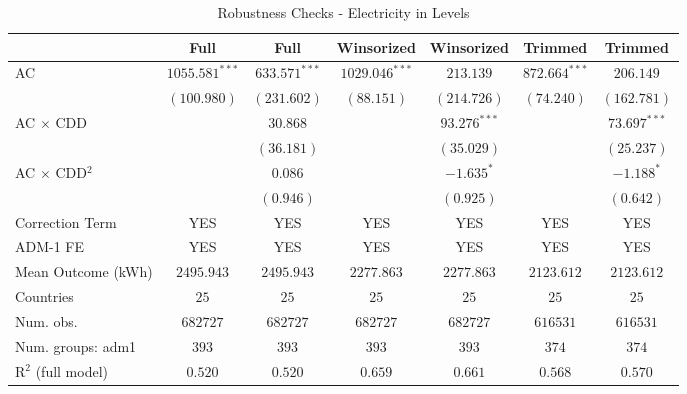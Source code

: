
\begin{table}[H]
\caption{Robustness Checks - Electricity in Levels}
\begin{center}
\begin{tabular}{l c c c c c c}
\hline
 & Full & Full & Winsorized & Winsorized & Trimmed & Trimmed \\
\hline
AC                      & $1055.581^{***}$ & $633.571^{***}$ & $1029.046^{***}$ & $213.139$      & $872.664^{***}$ & $206.149$      \\
                        & $(100.980)$      & $(231.602)$     & $(88.151)$       & $(214.726)$    & $(74.240)$      & $(162.781)$    \\
AC $\times$ CDD         &                  & $30.868$        &                  & $93.276^{***}$ &                 & $73.697^{***}$ \\
                        &                  & $(36.181)$      &                  & $(35.029)$     &                 & $(25.237)$     \\
AC $\times$ CDD$^2$     &                  & $0.086$         &                  & $-1.635^{*}$   &                 & $-1.188^{*}$   \\
                        &                  & $(0.946)$       &                  & $(0.925)$      &                 & $(0.642)$      \\
\hline
Correction Term         & YES              & YES             & YES              & YES            & YES             & YES            \\
ADM-1 FE                & YES              & YES             & YES              & YES            & YES             & YES            \\
Mean Outcome (kWh)      & $2495.943$       & $2495.943$      & $2277.863$       & $2277.863$     & $2123.612$      & $2123.612$     \\
Countries               & $25$             & $25$            & $25$             & $25$           & $25$            & $25$           \\
Num. obs.               & $682727$         & $682727$        & $682727$         & $682727$       & $616531$        & $616531$       \\
Num. groups: adm1       & $393$            & $393$           & $393$            & $393$          & $374$           & $374$          \\
R$^2$ (full model)      & $0.520$          & $0.520$         & $0.659$          & $0.661$        & $0.568$         & $0.570$        \\

\end{tabular}
\end{center}
\end{table}
